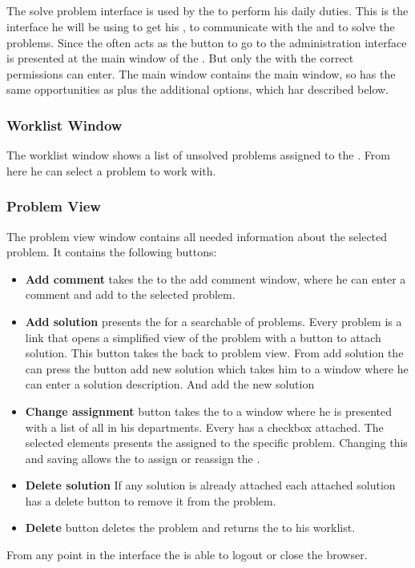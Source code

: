 
\subsection{\sinterface}
The solve problem interface is used by the \astaff[] to perform his daily duties. This is the interface he will be using to get his \todolist{}, to communicate with the \aclient{} and to solve the problems.
Since the \astaff{} often acts as \sadmin{} the button to go to the administration interface is presented at the main window of the \spinterface{}.
But only the \astaff{} with the correct permissions can enter.
The main window contains the \client{} main window, so \astaff{} has the same opportunities as \aclient{} plus the additional options, which har described below.


\subsubsection{Worklist Window}
The worklist window shows a list of unsolved problems assigned to the \astaff. From here he can select a problem to work with. 

\subsubsection{Problem View}
The problem view window contains all needed information about the selected problem. It contains the following buttons: 
\begin{itemize}
\item \textbf{Add comment}  takes the \astaff{} to the add comment window, where he can enter a comment and add to the selected problem. 

\item \textbf{Add solution} presents the \astaff{} for a searchable of problems. Every problem is a link that opens a simplified view of the problem with a button to attach solution. This button takes the \astaff{} back to problem view. From add solution the \astaff{} can press the button add new solution which takes him to a window where he can enter a solution description.
And add the new solution 

\item \textbf{Change assignment} button takes the \astaff{} to a window where he is presented with a list of all \staff{} in his departments. Every \staff{} has a checkbox attached. The selected elements presents the \staff{} assigned to the specific problem. Changing this and saving allows the \astaff{} to assign or reassign the \astaff{}. 

\item \textbf{Delete solution} If any solution is already attached each attached solution has a delete button to remove it from the problem. 

\item \textbf{Delete} button deletes the problem and returns the \staff{} to his worklist.

\end{itemize}
From any point in the interface the \astaff{} is able to logout or close the browser. 


